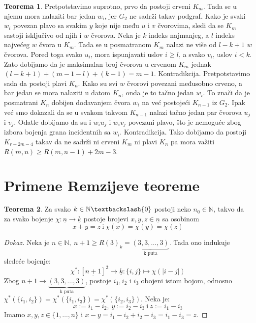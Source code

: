 \documentclass{article}
\theoremstyle{definition}
\newtheorem{teorema}{Teorema}[section]
\newcommand{\dokaz}[1]{\begin{proof}[Dokaz]#1\end{proof}}
\begin{document}
\begin{teorema}
{		Pretpotstavimo suprotno, prvo da postoji crveni $K_m$. Tada se u njemu mora nalaziti bar jedan $w_i$, jer $G_2$ ne sadrži takav podgraf. Kako 			je svaki $w_i$ povezan plavo sa svakim $y$ koje nije među $u$ i $v$ čvorovima, sledi da se $K_m$ sastoji isključivo od njih i $w$ čvorova. Neka je
		$k$ indeks najmanjeg, a $l$ indeks najvećeg $w$ čvora u $K_m$. Tada se u posmatranom $K_m$ nalazi ne više od $l - k + 1$ $w$ čvorova.
		Pored toga svako $u_i$, mora ispunjavati uslov $i \geq l$, a svako $v_i$, uslov $i < k$. Zato dobijamo da je maksimalan broj čvorova u crvenom
		$K_m$ jednak $(l - k + 1) + (m - 1 - l) + (k - 1) = m - 1$. Kontradikcija. \newline
		Pretpotstavimo sada da postoji plavi $K_n$. Kako su svi $w$ čvorovi povezani međusobno crveno, a bar jedan se mora nalaziti u datom $K_n$, 
		onda je to tačno jedan $w_i$. To znači da je posmatrani $K_n$ dobijen dodavanjem čvora $w_i$ na već postojeći $K_{n - 1}$ iz $G_2$. Ipak
		već smo dokazali da se u svakom takvom $K_{n - 1}$ nalazi tačno jedan par čvorova $u_j$ i $v_j$. Odatle dobijamo da su i $w_i u_j$ i $w_i v_j$
		povezani plavo, što je nemoguće zbog izbora bojenja grana incidentnih sa $w_i$. Kontradikcija. \newline
		Tako dobijamo da postoji $K_{r + 2m - 4}$ takav da ne sadrži ni crveni $K_m$ ni plavi $K_n$ pa mora važiti $R(m,n) \geq R(m,n-1) + 2m - 3$.
	}
	\end{teorema}


		\section{Primene Remzijeve teoreme}
		\begin{teorema}\label{sur}
			Za svako $k \in \mathbb{N}\textbackslash \{0\}$  postoji neko $n_{0} \in \mathbb{N}$, takvo da za svako bojenje $\chi:\underline{n} \rightarrow \underline{k}$ postoje brojevi $x, y, z \in \underline{n}$ sa osobinom 
			\[
			x + y = z \: \mathrm{i} \: \chi(x)= \chi(y)=\chi(z)
			\]
		\end{teorema}
		\dokaz{
			Neka je $n \in \mathbb{N},\: n+1 \geq R(3)_k=\underbrace{(3,3,\ldots,3)}_\text{k puta}$. Tada ono indukuje sledeće bojenje:
			\[
				\chi^*:[\underline{n+1}]^2\rightarrow \underline{k}:\{i,j\}\mapsto \chi(|i-j|)
			\]
			Zbog $n+1 \rightarrow \underbrace{(3,3,\ldots,3)}_\text{k puta}$, postoje $i_1, i_2$ i $i_3$ obojeni istom bojom, odnosno $\chi^*(\{i_1,i_2\})=\chi^*(\{i_1,i_3\})=\chi^*(\{i_2,i_3\})$. Neka je:
			\[
				x:=i_1-i_2,\:y:=i_2-i_3\:\mathrm{i}\:z:=i_1-i_3
			\]
			Imamo $x,y,z\in \{1,\ldots,n\}$ i $x-y=i_1-i_2+i_2-i_3=i_1-i_3=z$.
		}
\end{document}
